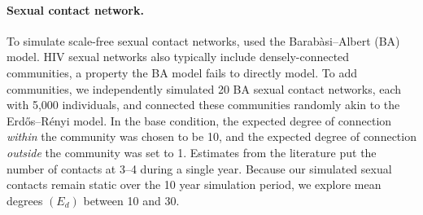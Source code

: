 \documentclass[a4paper,11pt]{article}
\newcommand{\authorcite}[1]{\citeauthor{#1}\supercite{#1}}
\begin{document}
\paragraph{Sexual contact network.}
To simulate scale-free sexual contact networks, \authorcite{Moshiri2018} used the Barab\`asi--Albert (BA) model.\supercite{Barabasi1999}
HIV sexual networks also typically include  densely-connected communities,\supercite{Rothenberg1998} a property the BA model fails to directly model.
To add communities,  we independently simulated 20 BA sexual contact networks,
each with 5,000 individuals, and connected these communities randomly akin to the Erd\H os--R\'enyi model.\supercite{Erdos1959}
In the base condition, the expected degree of connection \textit{within} the community was chosen to be 10,
and the expected degree of connection \textit{outside} the community was set to 1. 
Estimates from the literature put the number of contacts at 3--4 during a single year.\supercite{Rosenberg2011}
Because our simulated sexual contacts remain static over the 10 year simulation period, we explore mean degrees $(E_d)$ between 10 and 30.
\end{document}
